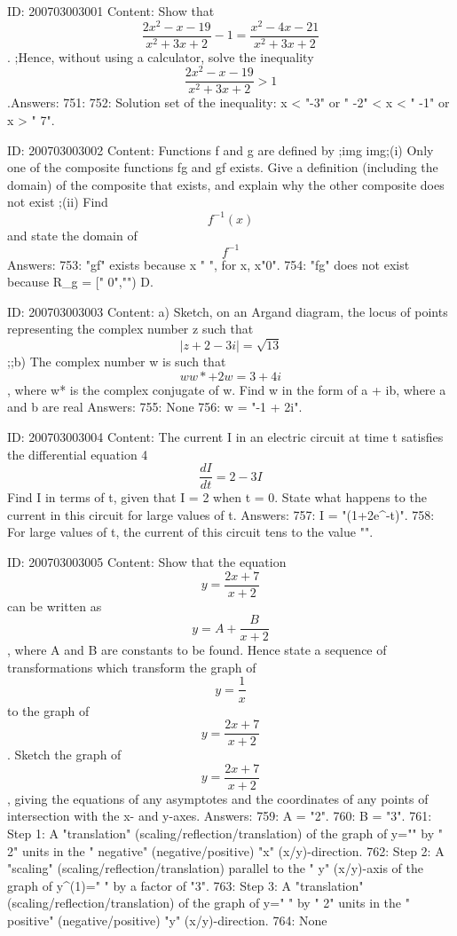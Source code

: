 \documentclass{article}
\begin{document}
ID: 200703003001
Content:
Show that $$ \frac{2x^{2}-x-19}{x^{2}+3x+2 }-1= \frac{ x^{2}-4x-21}{x^{2}+3x+2}$$. ;Hence, without using a calculator, solve the inequality $$ \frac{2x^{2}-x-19}{x^{2}+3x+2} > 1$$.Answers:
751: 
752: Solution set of the inequality: x < "-3" or " -2" < x < " -1" or x > " 7".

ID: 200703003002
Content:
Functions f and g are defined by ;img img;(i) Only one of the composite functions fg and gf exists. Give a definition (including the domain) of the composite that exists, and explain why the other composite does not exist ;(ii) Find $$f^{-1}(x)$$ and state the domain of $$f^{-1}$$ Answers:
753: "gf" exists because x \mapsto " ", for x\in{}, x\neq "0".
754: "fg" does not exist because R_g = [" 0","\infty") \notin D.

ID: 200703003003
Content:
a) Sketch, on an Argand diagram, the locus of points representing the complex number z such that $$|z+2-3i|= \sqrt{13} $$ ;;b) The complex number w is such that $$ww*+2w=3+4i$$ , where w* is the complex conjugate of w. Find w in the form of a + ib, where a and b are real Answers:
755: None
756: w = "-1 + 2i".

ID: 200703003004
Content:
The current I in an electric circuit at time t satisfies the differential equation 4$$\frac{dI}{dt}=2-3I$$  Find I in terms of t, given that I = 2 when t = 0.  State what happens to the current in this circuit for large values of t. Answers:
757: I = "(1+2e^{-t})".
758: For large values of t, the current of this circuit tens to the value "".

ID: 200703003005
Content:
Show that the equation $$y=\frac{2x+7}{x+2} $$ can be written as $$y= A + \frac{B}{x+2} $$, where A and B are constants to be found. Hence state a sequence of transformations which transform the graph of $$y= \frac{1}{x} $$ to the graph of $$y= \frac{2x + 7}{x + 2}$$.  Sketch the graph of $$y= \frac{2x + 7}{x + 2} $$, giving the equations of any asymptotes and the coordinates of any points of intersection with the x- and y-axes.  Answers:
759: A = "2".
760: B = "3".
761: Step 1: A "translation" (scaling/reflection/translation) of the graph of y="" by " 2" units in the " negative" (negative/positive) "x" (x/y)-direction.
762: Step 2: A "scaling" (scaling/reflection/translation) parallel to the " y" (x/y)-axis of the graph of y^{(1)}=" " by a factor of "3".
763: Step 3: A "translation" (scaling/reflection/translation) of the graph of y=" " by " 2" units in the " positive" (negative/positive) "y" (x/y)-direction.
764: None
\end{document}
